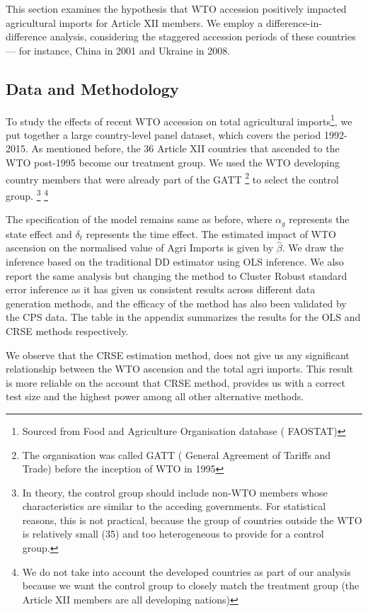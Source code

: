 \documentclass[11pt, a4paper, leqno]{article}
\begin{document}
This section examines the hypothesis that WTO accession positively impacted agricultural imports for Article XII members. We employ a difference-in-difference analysis, considering the staggered accession periods of these countries — for instance, China in 2001 and Ukraine in 2008.


\subsection{Data and Methodology}

To study the effects of recent WTO accession on total agricultural imports\footnote{Sourced from Food and Agriculture Organisation database ( FAOSTAT)}, we put together a large country-level panel dataset, which covers the period 1992-2015. As mentioned before, the 36 Article XII countries 
that ascended to the WTO post-1995 become our treatment group. We used the WTO developing country members that were already part of the GATT
\footnote{The organisation was called GATT ( General Agreement of Tariffs and Trade) before the inception of WTO in 1995} to select the control group. \footnote{In theory, the control group should include non-WTO members whose characteristics are similar to the acceding governments. 
For statistical reasons, this is not practical, because the group of countries outside the WTO is relatively small (35) and too heterogeneous to provide for a control group.} 
\footnote{We do not take into account the developed countries as part of our analysis because we want the control group to closely match the treatment group (the Article XII members are all developing nations)}

The specification of the model remains same as before, where $\alpha_g$ represents the state effect and $\delta_t$ represents the time effect. The estimated impact of WTO ascension on the normalised value of Agri Imports is given by $\hat{\beta}$.
We draw the inference based on the traditional DD estimator using OLS inference. We also report the same analysis but changing the method to Cluster Robust standard error inference as it has given us consistent results  across different data generation methods, 
and the efficacy of the method has also been  validated by the CPS data. The table in the appendix summarizes the results  for the OLS and CRSE methods respectively.

We observe that the CRSE estimation method, does not give us any significant relationship between the WTO ascension and the total agri imports. This result is more reliable on the account that CRSE method, provides us with a correct test size and the highest power among all other alternative methods.
\end{document}
